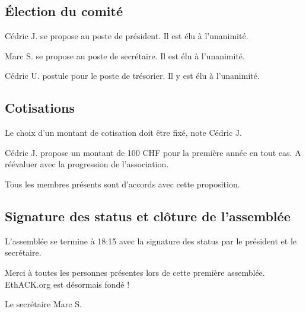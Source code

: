 \documentclass[12pt,twoside]{report}
\begin{document}
\subsection*{Élection du comité}
Cédric J. se propose au poste de président. Il est élu à l'unanimité.

Marc S. se propose au poste de secrétaire. Il est élu à l'unanimité.

Cédric U. postule pour le poste de trésorier. Il y est élu à l'unanimité.


\subsection*{Cotisations}
Le choix d'un montant de cotisation doit être fixé, note Cédric J.

Cédric J. propose un montant de 100 CHF pour la première année en tout cas. A réévaluer avec la progression de l'association.

Tous les membres présents sont d'accords avec cette proposition.

\subsection*{Signature des status et clôture de l'assemblée}
L'assemblée se termine à 18:15 avec la signature des status par le président et le secrétaire.

Merci à toutes les personnes présentes lors de cette première assemblée. EthACK.org est désormais fondé !


Le secrétaire
Marc S.
\end{document}
